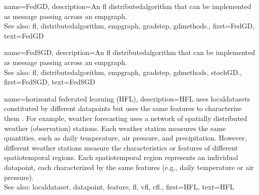 {name={FedGD},
	description={An \gls{fl} \gls{distributedalgorithm} that 
		can be implemented as message passing across an \gls{empgraph}. 
		\\ 
		See also: \gls{fl}, \gls{distributedalgorithm}, \gls{empgraph}, \gls{gradstep}, \gls{gdmethods}.},
	first={FedGD},
	text={FedGD}
} 

{name={FedSGD},
	description={An \gls{fl} \gls{distributedalgorithm} that 
		can be implemented as message passing across an \gls{empgraph}. 
		\\ 
		See also: \gls{fl}, \gls{distributedalgorithm}, \gls{empgraph}, \gls{gradstep}, \gls{gdmethods}, \gls{stochGD}.},
	first={FedSGD},
	text={FedSGD}
} 

{name={horizontal federated learning (HFL)},
	description={HFL uses \glspl{localdataset} constituted by different
	   	\glspl{datapoint} but uses the same \glspl{feature} to characterize them \cite{HFLChapter2020}.
		For example, weather forecasting uses a network of spatially distributed
		weather (observation) stations. Each weather station measures the
		same quantities, such as daily temperature, air pressure, and precipitation.
		However, different weather stations measure the characteristics or
		\glspl{feature} of different spatiotemporal regions. Each spatiotemporal region 
		represents an individual \gls{datapoint}, each characterized by the same \glspl{feature} 
		(e.g., daily temperature or air pressure).\\
		See also: \gls{localdataset}, \gls{datapoint}, \gls{feature}, \gls{fl}, \gls{vfl}, \gls{cfl}.},
	first={HFL},
	text={HFL}
} 


